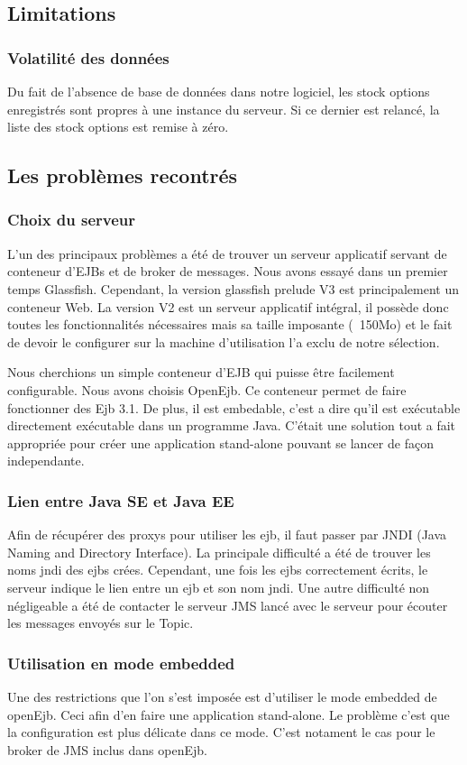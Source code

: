\subsection{Limitations}
\subsubsection{Volatilité des données}
Du fait de l'absence de base de données dans notre logiciel, les stock options enregistrés sont propres à une instance du serveur. Si ce dernier est relancé, la liste des stock options est remise à zéro.
\subsection{Les problèmes recontrés}
\subsubsection{Choix du serveur}
L'un des principaux problèmes a été de trouver un serveur applicatif servant de conteneur d'EJBs et de broker de messages. Nous avons essayé dans un premier temps Glassfish. Cependant, la version glassfish prelude V3 est principalement un conteneur Web. La version V2 est un serveur applicatif intégral, il possède donc toutes les fonctionnalités nécessaires mais sa taille imposante (~150Mo) et le fait de devoir le configurer sur la machine d'utilisation l'a exclu de notre sélection.

Nous cherchions un simple conteneur d'EJB qui puisse être facilement configurable. Nous avons choisis OpenEjb. Ce conteneur permet de faire fonctionner des Ejb 3.1. De plus, il est embedable, c'est a dire qu'il est exécutable directement exécutable dans un programme Java. C'était une solution tout a fait appropriée pour créer une application stand-alone pouvant se lancer de façon independante.
\subsubsection{Lien entre Java SE et Java EE}
Afin de récupérer des proxys pour utiliser les ejb, il faut passer par JNDI (Java Naming and Directory Interface). La principale difficulté a été de trouver les noms jndi des ejbs crées. Cependant, une fois les ejbs correctement écrits, le serveur indique le lien entre un ejb et son nom jndi. Une autre difficulté non négligeable a été de contacter le serveur JMS lancé avec le serveur pour écouter les messages envoyés sur le Topic.
\subsubsection{Utilisation en mode embedded}
Une des restrictions que l'on s'est imposée est d'utiliser le mode embedded de openEjb. Ceci afin d'en faire une application stand-alone. Le problème c'est que la configuration est plus délicate dans ce mode. C'est notament le cas pour le broker de JMS inclus dans openEjb.
